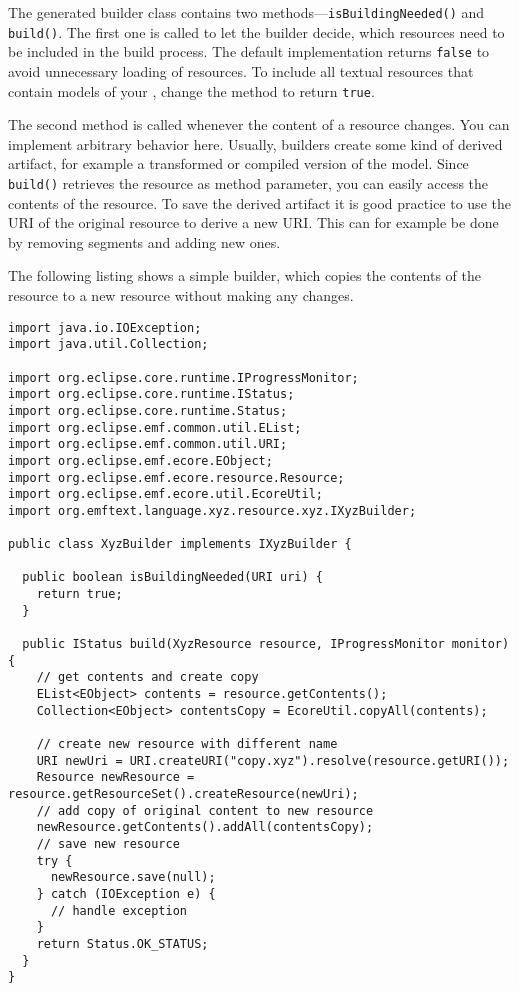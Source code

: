 The generated builder class contains two methods---\texttt{isBuildingNeeded()} and
\texttt{build()}. The first one is called to let the builder decide, which
resources need to be included in the build process. The default implementation
returns \texttt{false} to avoid unnecessary loading of resources. To include all
textual resources that contain models of your \DSL, change the method to return
\texttt{true}.

The second method is called whenever the content of a resource changes. You can
implement arbitrary behavior here. Usually, builders create some kind of derived
artifact, for example a transformed or compiled version of the \DSL model. Since
\texttt{build()} retrieves the resource as method parameter, you can easily
access the contents of the resource. To save the derived artifact it is good
practice to use the URI of the original resource to derive a new URI. This can
for example be done by removing segments and adding new ones.

The following listing shows a simple builder, which copies the contents of the
resource to a new resource without making any changes.

\lstset{language=Java}
\begin{lstlisting}
import java.io.IOException;
import java.util.Collection;

import org.eclipse.core.runtime.IProgressMonitor;
import org.eclipse.core.runtime.IStatus;
import org.eclipse.core.runtime.Status;
import org.eclipse.emf.common.util.EList;
import org.eclipse.emf.common.util.URI;
import org.eclipse.emf.ecore.EObject;
import org.eclipse.emf.ecore.resource.Resource;
import org.eclipse.emf.ecore.util.EcoreUtil;
import org.emftext.language.xyz.resource.xyz.IXyzBuilder;

public class XyzBuilder implements IXyzBuilder {
  
  public boolean isBuildingNeeded(URI uri) {
    return true;
  }
  
  public IStatus build(XyzResource resource, IProgressMonitor monitor) {
    // get contents and create copy 
    EList<EObject> contents = resource.getContents();
    Collection<EObject> contentsCopy = EcoreUtil.copyAll(contents);
    
    // create new resource with different name
    URI newUri = URI.createURI("copy.xyz").resolve(resource.getURI());
    Resource newResource = resource.getResourceSet().createResource(newUri);
    // add copy of original content to new resource
    newResource.getContents().addAll(contentsCopy);
    // save new resource
    try {
      newResource.save(null);
    } catch (IOException e) {
      // handle exception
    }
    return Status.OK_STATUS;
  }
}
\end{lstlisting}

